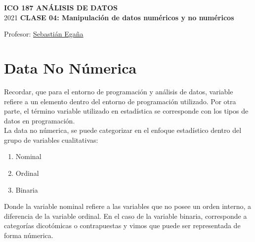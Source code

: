 \documentclass[12 pt,letterpaper]{article}
\begin{document}
%

	
	\pagestyle{fancy}
	\fancyhf{}
	\renewcommand{\headrulewidth}{0pt}
	\renewcommand{\footrulewidth}{0pt}	
	
\begin{center}
		
	\bigbreak
	\textbf{ICO 187 ANÁLISIS DE DATOS}\\
	\small{2021}
	\break
	\textbf{CLASE 04: Manipulación de datos numéricos y no numéricos}\\
\end{center}

\begin{flushright}	
		
	Profesor: \href{mailto:sebastianeganasa@santotomas.cl}{Sebastián Egaña}

\end{flushright}

\section{Data No Númerica}

Recordar, que para el entorno de programación y análisis de datos, variable refiere a un elemento dentro del entorno de programación utilizado. Por otra parte, el término variable utilizado en estadística se corresponde con los tipos de datos en programación. \\

La data no númerica, se puede categorizar en el enfoque estadístico dentro del grupo de variables cualitativas:

\begin{enumerate}
	\item Nominal
	\item Ordinal
	\item Binaria
\end{enumerate}

Donde la variable nominal refiere a las variables que no posee un orden interno, a diferencia de la variable ordinal. En el caso de la variable binaria, corresponde a categorías dicotómicas o contrapuestas y vimos que puede ser representada de forma númerica. \\
\end{document}

